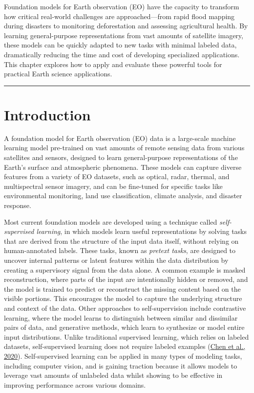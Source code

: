 \documentclass[
  letterpaper,
  DIV=11,
  numbers=noendperiod]{scrreprt}
\begin{document}
Foundation models for Earth observation (EO) have the capacity to
transform how critical real-world challenges are approached---from rapid
flood mapping during disasters to monitoring deforestation and assessing
agricultural health. By learning general-purpose representations from
vast amounts of satellite imagery, these models can be quickly adapted
to new tasks with minimal labeled data, dramatically reducing the time
and cost of developing specialized applications. This chapter explores
how to apply and evaluate these powerful tools for practical Earth
science applications.

\begin{center}\rule{0.5\linewidth}{0.5pt}\end{center}

\section{Introduction}\label{introduction-1}

A foundation model for Earth observation (EO) data is a large-scale
machine learning model pre-trained on vast amounts of remote sensing
data from various satellites and sensors, designed to learn
general-purpose representations of the Earth's surface and atmospheric
phenomena. These models can capture diverse features from a variety of
EO datasets, such as optical, radar, thermal, and multispectral sensor
imagery, and can be fine-tuned for specific tasks like environmental
monitoring, land use classification, climate analysis, and disaster
response.

Most current foundation models are developed using a technique called
\emph{self-supervised learning}, in which models learn useful
representations by solving tasks that are derived from the structure of
the input data itself, without relying on human-annotated labels. These
tasks, known as \emph{pretext tasks}, are designed to uncover internal
patterns or latent features within the data distribution by creating a
supervisory signal from the data alone. A common example is masked
reconstruction, where parts of the input are intentionally hidden or
removed, and the model is trained to predict or reconstruct the missing
content based on the visible portions. This encourages the model to
capture the underlying structure and context of the data. Other
approaches to self-supervision include contrastive learning, where the
model learns to distinguish between similar and dissimilar pairs of
data, and generative methods, which learn to synthesize or model entire
input distributions. Unlike traditional supervised learning, which
relies on labeled datasets, self-supervised learning does not require
labeled examples (\href{https://doi.org/10.48550/arXiv.2002.05709}{Chen
et al., 2020}). Self-supervised learning can be applied in many types of
modeling tasks, including computer vision, and is gaining traction
because it allows models to leverage vast amounts of unlabeled data
whilst showing to be effective in improving performance across various
domains.
\end{document}
